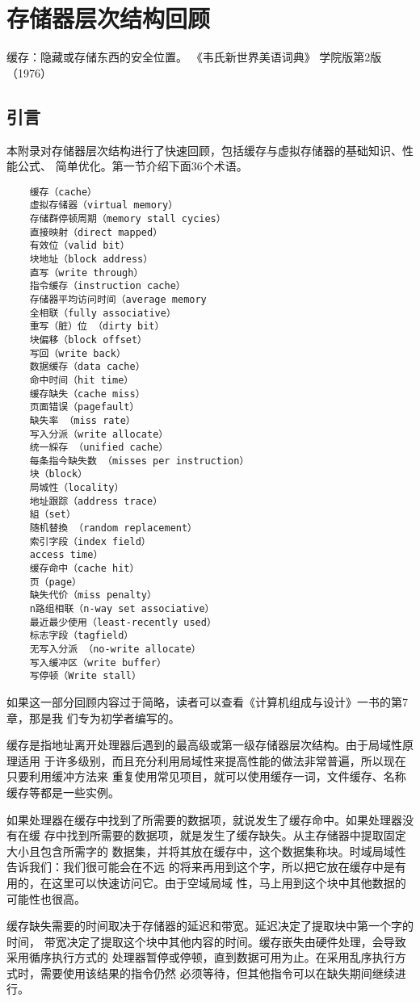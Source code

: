 \chapter{存储器层次结构回顾}
缓存：隐藏或存储东西的安全位置。
《韦氏新世界美语词典》
学院版第2版（1976）

\section{引言}
本附录对存储器层次结构进行了快速回顾，包括缓存与虚拟存储器的基础知识、性能公式、
简单优化。第一节介绍下面36个术语。
\begin{verbatim}
    缓存（cache）
    虛拟存储器（virtual memory）
    存储群停顿周期（memory stall cycies）
    直接映射（direct mapped）
    有效位（valid bit）
    块地址（block address）
    直写（write through）
    指令缓存（instruction cache）
    存储器平均访问时间（average memory
    全相联（fully associative）
    重写（脏）位 （dirty bit）
    块偏移（block offset）
    写回（write back）
    数据缓存（data cache）
    命中时间（hit time）
    缓存缺失（cache miss）
    页面错误（pagefault）
    缺失率 （miss rate）
    写入分派（write allocate）
    统一綵存 （unified cache）
    每条指今缺失数 （misses per instruction）
    块（block）
    局城性（locality）
    地址跟踪（address trace）
    組（set）
    随机替換 （random replacement）
    索引字段（index field）
    access time）
    缓存命中（cache hit）
    页（page）
    缺失代价（miss penalty）
    n路组相联（n-way set associative）
    最近最少使用（least-recently used）
    标志字段（tagfield）
    无写入分派 （no-write allocate）
    写入缓冲区（write buffer）
    写停顿（Write stall）
\end{verbatim}
如果这一部分回顾内容过于简略，读者可以查看《计算机组成与设计》一书的第7章，那是我
们专为初学者编写的。

缓存是指地址离开处理器后遇到的最高级或第一级存储器层次结构。由于局域性原理适用
于许多级别，而且充分利用局域性来提高性能的做法非常普遍，所以现在只要利用缓冲方法来
重复使用常见项目，就可以使用缓存一词，文件缓存、名称缓存等都是一些实例。

如果处理器在缓存中找到了所需要的数据项，就说发生了缓存命中。如果处理器没有在缓
存中找到所需要的数据项，就是发生了缓存缺失。从主存储器中提取固定大小且包含所需字的
数据集，并将其放在缓存中，这个数据集称块。时域局域性告诉我们：我们很可能会在不远
的将来再用到这个字，所以把它放在缓存中是有用的，在这里可以快速访问它。由于空域局域
性，马上用到这个块中其他数据的可能性也很高。

缓存缺失需要的时间取决于存储器的延迟和带宽。延迟决定了提取块中第一个字的时间，
带宽决定了提取这个块中其他内容的时间。缓存嵌失由硬件处理，会导致采用循序执行方式的
处理器暂停或停顿，直到数据可用为止。在采用乱序执行方式时，需要使用该结果的指令仍然
必须等待，但其他指令可以在缺失期间继续进行。


